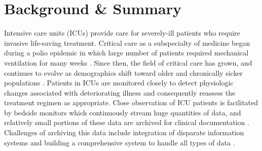 \documentclass[english]{article}
\begin{document}
\section*{Background \& Summary}




Intensive care units (ICUs) provide care for severely-ill patients who require invasive life-saving treatment. Critical care as a subspecialty of medicine began during a polio epidemic in which large number of patients required mechanical ventilation for many weeks \cite{kelly2014intensive}. Since then, the field of critical care has grown, and continues to evolve as demographics shift toward older and chronically sicker populations \cite{adhikari2010critical}.
Patients in ICUs are monitored closely to detect physiologic changes associated with deteriorating illness and consequently reassess the treatment regimen as appropriate.
Close observation of ICU patients is facilitated by bedside monitors which continuously stream huge quantities of data, and relatively small portions of these data are archived for clinical documentation \cite{Celi2013loop}.
Challenges of archiving this data include integration of disparate information systems and building a comprehensive system to handle all types of data \cite{johnson2016machine}.
\end{document}
